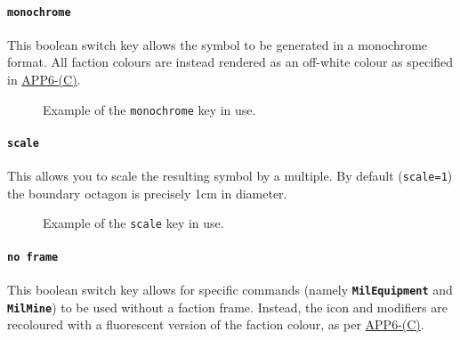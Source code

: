 \documentclass[a4paper, titlepage]{article}
\newcommand\DocLink{\href{https://www.awl.edu.pl/images/en/APP_6_C.pdf}{APP6-(C)}}
\begin{document}
\paragraph{\texttt{monochrome}}

This boolean switch key allows the symbol to be generated in a monochrome format. All faction colours are instead rendered as an off-white colour as specified in \DocLink. 

\begin{figure}[H]
\centering
{}
\caption{Example of the \texttt{monochrome} key in use.}
\end{figure}

\paragraph{\texttt{scale}}

This allows you to scale the resulting symbol by a multiple. By default (\texttt{scale=1}) the boundary octagon is precisely 1cm in diameter.

\begin{figure}[H]
\centering
{}
\caption{Example of the \texttt{scale} key in use.}
\end{figure}

\paragraph{\texttt{no frame}}

This boolean switch key allows for specific commands (namely \textbf{\texttt{MilEquipment}} and \textbf{\texttt{MilMine}}) to be used without a faction frame. Instead, the icon and modifiers are recoloured with a fluorescent version of the faction colour, as per \DocLink.
\end{document}
